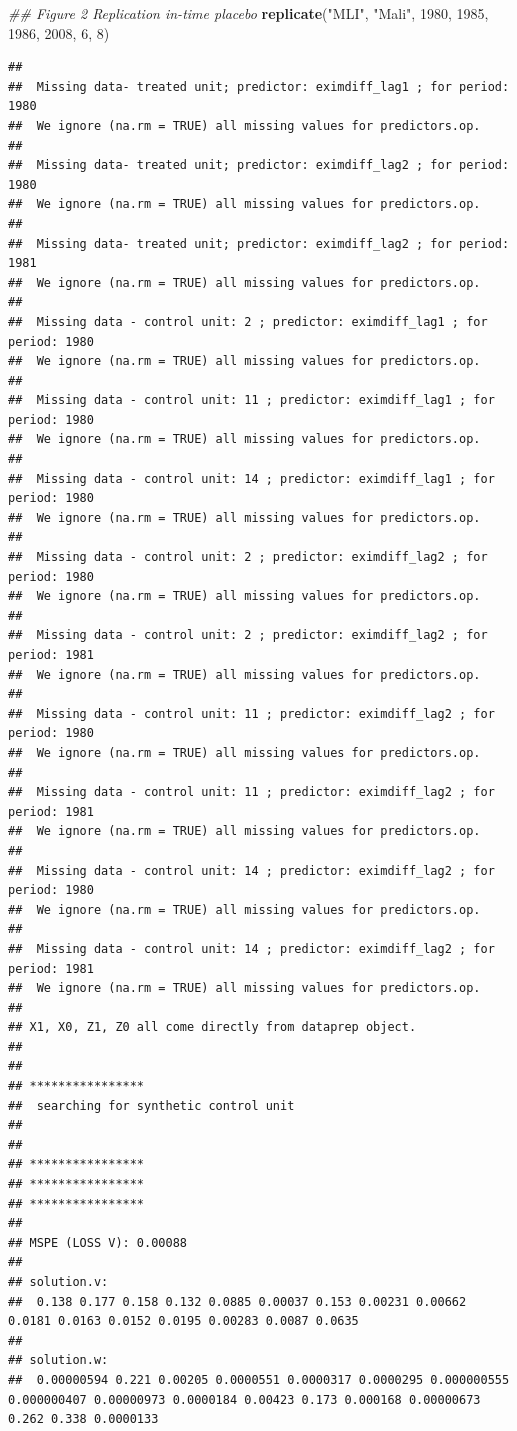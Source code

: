 \documentclass[]{article}
\newenvironment{Shaded}{\begin{snugshade}}{\end{snugshade}}
\newcommand{\CommentTok}[1]{\textcolor[rgb]{0.56,0.35,0.01}{\textit{#1}}}
\newcommand{\DecValTok}[1]{\textcolor[rgb]{0.00,0.00,0.81}{#1}}
\newcommand{\KeywordTok}[1]{\textcolor[rgb]{0.13,0.29,0.53}{\textbf{#1}}}
\newcommand{\NormalTok}[1]{#1}
\newcommand{\StringTok}[1]{\textcolor[rgb]{0.31,0.60,0.02}{#1}}
\begin{document}
\begin{Shaded}
\begin{Highlighting}[]
\CommentTok{## Figure 2 Replication in-time placebo}
\KeywordTok{replicate}\NormalTok{(}\StringTok{"MLI"}\NormalTok{, }\StringTok{"Mali"}\NormalTok{, }\DecValTok{1980}\NormalTok{, }\DecValTok{1985}\NormalTok{, }\DecValTok{1986}\NormalTok{, }\DecValTok{2008}\NormalTok{, }\DecValTok{6}\NormalTok{, }\DecValTok{8}\NormalTok{)}
\end{Highlighting}
\end{Shaded}

\begin{verbatim}
## 
##  Missing data- treated unit; predictor: eximdiff_lag1 ; for period: 1980 
##  We ignore (na.rm = TRUE) all missing values for predictors.op.
## 
##  Missing data- treated unit; predictor: eximdiff_lag2 ; for period: 1980 
##  We ignore (na.rm = TRUE) all missing values for predictors.op.
## 
##  Missing data- treated unit; predictor: eximdiff_lag2 ; for period: 1981 
##  We ignore (na.rm = TRUE) all missing values for predictors.op.
## 
##  Missing data - control unit: 2 ; predictor: eximdiff_lag1 ; for period: 1980 
##  We ignore (na.rm = TRUE) all missing values for predictors.op.
## 
##  Missing data - control unit: 11 ; predictor: eximdiff_lag1 ; for period: 1980 
##  We ignore (na.rm = TRUE) all missing values for predictors.op.
## 
##  Missing data - control unit: 14 ; predictor: eximdiff_lag1 ; for period: 1980 
##  We ignore (na.rm = TRUE) all missing values for predictors.op.
## 
##  Missing data - control unit: 2 ; predictor: eximdiff_lag2 ; for period: 1980 
##  We ignore (na.rm = TRUE) all missing values for predictors.op.
## 
##  Missing data - control unit: 2 ; predictor: eximdiff_lag2 ; for period: 1981 
##  We ignore (na.rm = TRUE) all missing values for predictors.op.
## 
##  Missing data - control unit: 11 ; predictor: eximdiff_lag2 ; for period: 1980 
##  We ignore (na.rm = TRUE) all missing values for predictors.op.
## 
##  Missing data - control unit: 11 ; predictor: eximdiff_lag2 ; for period: 1981 
##  We ignore (na.rm = TRUE) all missing values for predictors.op.
## 
##  Missing data - control unit: 14 ; predictor: eximdiff_lag2 ; for period: 1980 
##  We ignore (na.rm = TRUE) all missing values for predictors.op.
## 
##  Missing data - control unit: 14 ; predictor: eximdiff_lag2 ; for period: 1981 
##  We ignore (na.rm = TRUE) all missing values for predictors.op.
## 
## X1, X0, Z1, Z0 all come directly from dataprep object.
## 
## 
## **************** 
##  searching for synthetic control unit  
##  
## 
## **************** 
## **************** 
## **************** 
## 
## MSPE (LOSS V): 0.00088 
## 
## solution.v:
##  0.138 0.177 0.158 0.132 0.0885 0.00037 0.153 0.00231 0.00662 0.0181 0.0163 0.0152 0.0195 0.00283 0.0087 0.0635 
## 
## solution.w:
##  0.00000594 0.221 0.00205 0.0000551 0.0000317 0.0000295 0.000000555 0.000000407 0.00000973 0.0000184 0.00423 0.173 0.000168 0.00000673 0.262 0.338 0.0000133
\end{verbatim}
\end{document}
